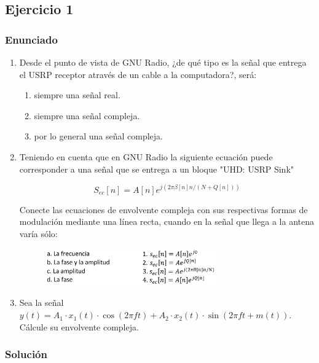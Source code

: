 \subsection{Ejercicio 1}
\subsubsection{Enunciado}
\begin{enumerate}

\item Desde el punto de vista de GNU Radio, ¿de qu\'e tipo es la se\~nal que entrega el USRP receptor atrav\'es de un cable a la computadora?, será:
	\begin{enumerate}
      \item siempre una se\~nal real.
      \item siempre una se\~nal compleja.
      \item por lo general una se\~nal compleja.
	\end{enumerate}
    
\item Teniendo en cuenta que en GNU Radio la siguiente ecuaci\'on puede corresponder a una señal que se entrega a un bloque "UHD: USRP Sink"



\begin{equation} \label{capdos_quince}
S_{ec}[n] = A[n]e^{j(2 \pi  \beta[n]n/(N+Q[n]))}
\end{equation}

Conecte las ecuaciones de envolvente compleja con sus respectivas formas de modulaci\'on mediante una l\'inea recta, cuando en la señal que llega a la antena var\'ia s\'olo:

    \begin{figure} [h!] 
    \centering
    \includegraphics[width=0.7\textwidth]{Imagenes/Comu_1.png}
    \end{figure}

\item Sea la se\~nal $ y(t)=A_{1}\cdot x_{1}(t)\cdot \cos (2\pi ft)+ A_{2}\cdot x_{2}(t)\cdot \sin (2\pi ft+ m(t))$. C\'alcule su envolvente compleja. \\
\end{enumerate}


\subsubsection{Solución}

